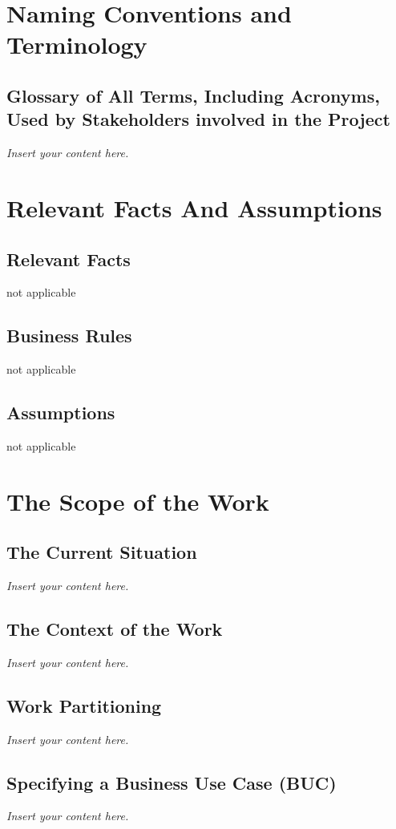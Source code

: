 \documentclass[12pt]{article}
\newcommand{\lips}{\textit{Insert your content here.}}
\begin{document}
\section{Naming Conventions and Terminology}
\subsection{Glossary of All Terms, Including Acronyms, Used by Stakeholders
  involved in the Project}
\lips

\section{Relevant Facts And Assumptions}
\subsection{Relevant Facts}

not applicable

\subsection{Business Rules}

not applicable

\subsection{Assumptions}

not applicable

\section{The Scope of the Work}
\subsection{The Current Situation}
\lips
\subsection{The Context of the Work}
\lips
\subsection{Work Partitioning}
\lips
\subsection{Specifying a Business Use Case (BUC)}
\lips
\end{document}
